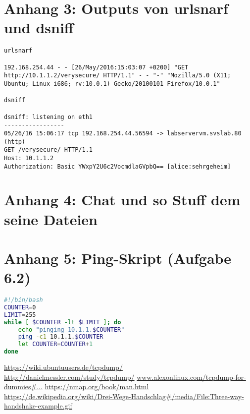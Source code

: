 \documentclass[twoside]{article}
\begin{document}
\section*{Anhang 3: Outputs von urlsnarf und dsniff}
\begin{lstlisting}
urlsnarf

192.168.254.44 - - [26/May/2016:15:03:07 +0200] "GET http://10.1.1.2/verysecure/ HTTP/1.1" - - "-" "Mozilla/5.0 (X11; Ubuntu; Linux i686; rv:10.0.1) Gecko/20100101 Firefox/10.0.1"

dsniff

dsniff: listening on eth1
-----------------
05/26/16 15:06:17 tcp 192.168.254.44.56594 -> labservervm.svslab.80 (http)
GET /verysecure/ HTTP/1.1
Host: 10.1.1.2
Authorization: Basic YWxpY2U6c2VocmdlaGVpbQ== [alice:sehrgeheim] 
\end{lstlisting}

\section*{Anhang 4: Chat und so Stuff dem seine Dateien}


\section*{Anhang 5: Ping-Skript (Aufgabe 6.2)}
\begin{lstlisting}[language=Bash]
#!/bin/bash
COUNTER=0
LIMIT=255
while [ $COUNTER -lt $LIMIT ]; do
	echo "pinging 10.1.1.$COUNTER"
	ping -c1 10.1.1.$COUNTER
	let COUNTER=COUNTER+1
done
\end{lstlisting}

\begin{thebibliography}{1}
		\url{https://wiki.ubuntuusers.de/tcpdump/}
		\url{http://danielmessler.com/study/tcpdump/}
			\url{www.alexonlinux.com/tcpdump-for-dummies\#...}
			\url{https://nmap.org/book/man.html}
			\url{https://de.wikipedia.org/wiki/Drei-Wege-Handschlag#/media/File:Three-way-handshake-example.gif}
\end{thebibliography}
\end{document}
